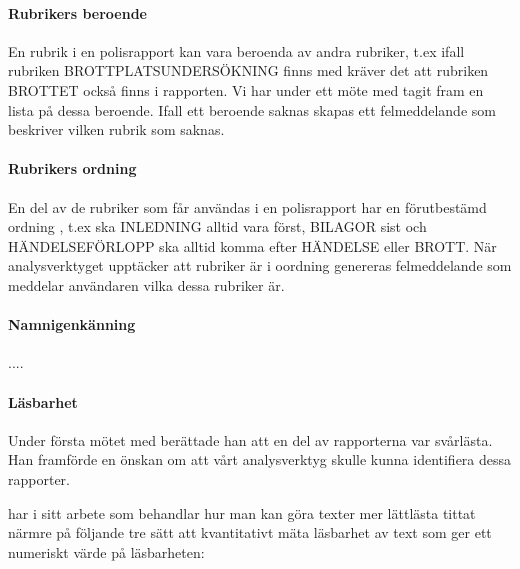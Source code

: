\documentclass[swedish]{maucsthesis}
\begin{document}
\paragraph{Rubrikers beroende}
En rubrik i en polisrapport kan vara beroenda av andra rubriker, t.ex ifall
rubriken BROTTPLATSUNDERSÖKNING finns med kräver det att rubriken BROTTET också
finns i rapporten. Vi har under ett möte med \cite{perintervju:2019} tagit fram
en lista på dessa beroende. Ifall ett beroende saknas skapas ett felmeddelande
som beskriver vilken rubrik som saknas.

\paragraph{Rubrikers ordning}
En del av de rubriker som får användas i en polisrapport har en förutbestämd
ordning \citep{durtva:2017}, t.ex ska INLEDNING alltid vara först, BILAGOR sist
och HÄNDELSEFÖRLOPP ska alltid komma efter HÄNDELSE eller BROTT. När
analysverktyget upptäcker att rubriker är i oordning genereras felmeddelande som
meddelar användaren vilka dessa rubriker är.

\paragraph{Namnigenkänning}

....

\paragraph{Läsbarhet}

Under första mötet med \cite{perintervju:2019} berättade han att en del av
rapporterna var svårlästa. Han framförde en önskan om att vårt analysverktyg
skulle kunna identifiera dessa rapporter.

\cite{abrahamsson:2011} har i sitt arbete som behandlar hur man kan göra texter
mer lättlästa tittat närmre på följande tre sätt att kvantitativt mäta läsbarhet
av text som ger ett numeriskt värde på läsbarheten:
\end{document}
